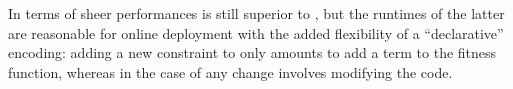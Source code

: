 In terms of sheer performances \liftcreatehr{} is still superior to 
\liftcreatega{}, but the runtimes of the latter are reasonable for online 
deployment with the added flexibility of a ``declarative'' encoding: 
adding a new constraint to \liftcreatega{} only amounts to add a term to 
the fitness function, whereas in the case of \liftcreatehr{} any change 
involves modifying the code.


